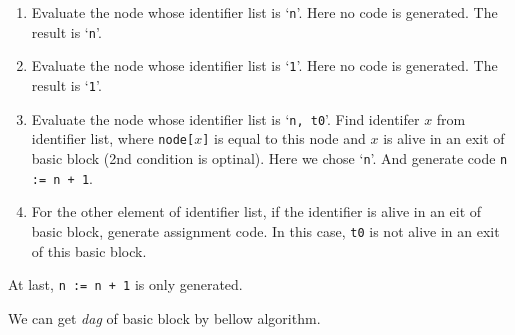 \begin{Example}
\begin{enumerate}
\item Evaluate the node whose identifier list is `{\tt{n}}'.
      Here no code is generated. The result is `{\tt{n}}'.

\item Evaluate the node whose identifier list is `{\tt{1}}'.
      Here no code is generated. The result is `{\tt{1}}'.

\item Evaluate the node whose identifier list is `{\tt{n, t0}}'.
      Find identifer $x$ from identifier list, where {\tt{node[$x$]}} is equal
      to this node and $x$ is alive in an exit of basic block
      (2nd condition is optinal). Here we chose `{\tt{n}}'.
      And generate code {\tt{n := n + 1}}.
 
\item For the other element of identifier list, if the identifier
      is alive in an eit of basic block, generate assignment code.
      In this case, {\tt{t0}} is not alive in an exit of this
      basic block.

\end{enumerate}
At last, {\tt{n := n + 1}} is only generated.
\end{Example}

We can get {\em dag} of basic block by bellow algorithm.

